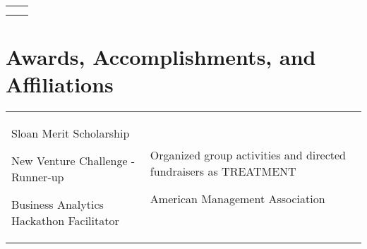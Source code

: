 \documentclass[a4paper,10pt]{article}
\begin{document}
\begin{supertabular}{p{13.9cm}>{\raggedleft\arraybackslash}p{3.4cm}}
\begin{enumerate*}[label =$\circ$, itemjoin={\newline}]
	\end{enumerate*} & \\
	 \\

\end{supertabular}







\smallskip
\section{Awards, Accomplishments, and Affiliations}
\begin{supertabular}{p{8.65cm} p{8.65cm}}

	\begin{enumerate*}[label =$\circ$, itemjoin={\newline}]
		\item \small Sloan Merit Scholarship
		\item \small New Venture Challenge - Runner-up
		\item \small Business Analytics Hackathon Facilitator
																\end{enumerate*}


	& \begin{enumerate*}[label =$\circ$, itemjoin={\newline}]
                                \item \small Organized group activities and directed fundraisers as TREATMENT
                                \item \small American Management Association
                                \end{enumerate*}  \vspace{2mm} \\


\end{supertabular}




\smallskip
\end{document}
